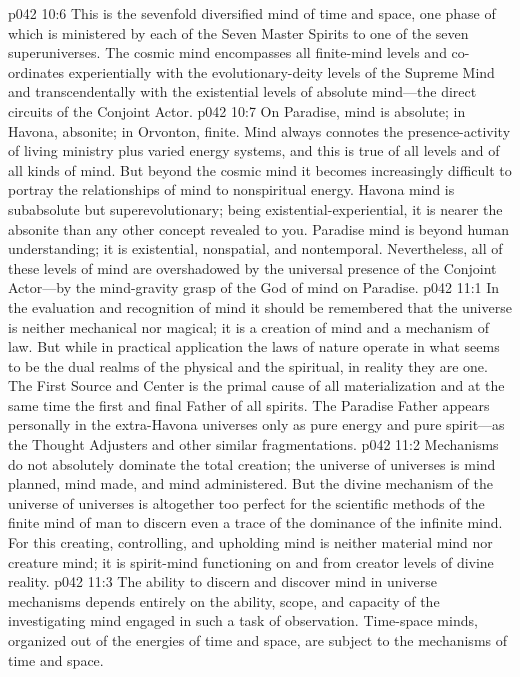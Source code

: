 \pc \vs p042 10:6  This is the sevenfold diversified mind of time and space, one phase of which is ministered by each of the Seven Master Spirits to one of the seven superuniverses. The cosmic mind encompasses all finite\hyp{}mind levels and co\hyp{}ordinates experientially with the evolutionary\hyp{}deity levels of the Supreme Mind and transcendentally with the existential levels of absolute mind---the direct circuits of the Conjoint Actor.
\vs p042 10:7 On Paradise, mind is absolute; in Havona, absonite; in Orvonton, finite. Mind always connotes the presence\hyp{}activity of living ministry plus varied energy systems, and this is true of all levels and of all kinds of mind. But beyond the cosmic mind it becomes increasingly difficult to portray the relationships of mind to nonspiritual energy. Havona mind is subabsolute but superevolutionary; being existential\hyp{}experiential, it is nearer the absonite than any other concept revealed to you. Paradise mind is beyond human understanding; it is existential, nonspatial, and nontemporal. Nevertheless, all of these levels of mind are overshadowed by the universal presence of the Conjoint Actor---by the mind\hyp{}gravity grasp of the God of mind on Paradise.
\vs p042 11:1 In the evaluation and recognition of mind it should be remembered that the universe is neither mechanical nor magical; it is a creation of mind and a mechanism of law. But while in practical application the laws of nature operate in what seems to be the dual realms of the physical and the spiritual, in reality they are one. The First Source and Center is the primal cause of all materialization and at the same time the first and final Father of all spirits. The Paradise Father appears personally in the extra\hyp{}Havona universes only as pure energy and pure spirit---as the Thought Adjusters and other similar fragmentations.
\pc \vs p042 11:2 Mechanisms do not absolutely dominate the total creation; the universe of universes  is mind planned, mind made, and mind administered. But the divine mechanism of the universe of universes is altogether too perfect for the scientific methods of the finite mind of man to discern even a trace of the dominance of the infinite mind. For this creating, controlling, and upholding mind is neither material mind nor creature mind; it is spirit\hyp{}mind functioning on and from creator levels of divine reality.
\vs p042 11:3 The ability to discern and discover mind in universe mechanisms depends entirely on the ability, scope, and capacity of the investigating mind engaged in such a task of observation. Time\hyp{}space minds, organized out of the energies of time and space, are subject to the mechanisms of time and space.
